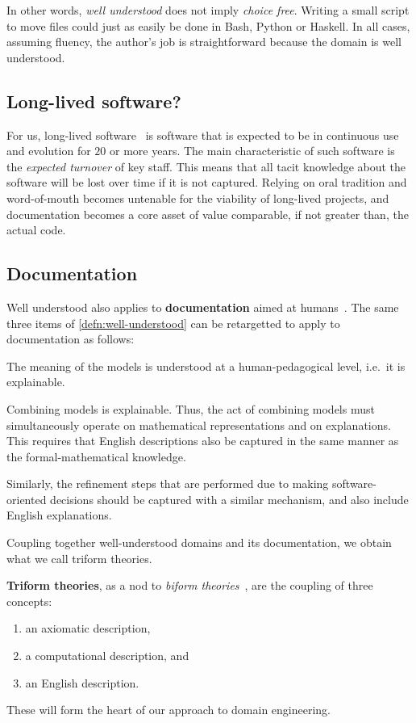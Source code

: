 \documentclass[a4paper,UKenglish,cleveref,autoref,thm-restate]{oasics-v2021}
\begin{document}
In other words, \emph{well understood} does not imply \emph{choice free}.
Writing a small script to move files could just as easily be done in Bash,
Python or Haskell. In all cases, assuming fluency, the author's job is
straightforward because the domain is well understood.

\subsection{Long-lived software?}
\label{subsec:long-lived-software}

For us, long-lived software~\cite{SPL-long-lived} is software that is expected
to be in continuous use and evolution for \(20\) or more years. The main
characteristic of such software is the \emph{expected turnover} of key staff.
This means that all tacit knowledge about the software will be lost over time if
it is not captured. Relying on oral tradition and word-of-mouth becomes untenable
for the viability of long-lived projects, and documentation becomes a core asset of
value comparable, if not greater than, the actual code.

\subsection{Documentation}
\label{subsec:documentation}

Well understood also applies to \textbf{documentation} aimed
at humans~\cite{parnas2011precise}. The same three items of
\ref{defn:well-understood} can be retargetted to apply to
documentation as follows:
\begin{enumerate*}
\item The meaning of the models is understood at a human-pedagogical level,
i.e.\ it is explainable.
\item Combining models is explainable. Thus, the act of combining models
must simultaneously
operate on mathematical representations and on explanations. This requires that
English descriptions also be captured in the same manner as the
formal-mathematical knowledge.
\item Similarly, the refinement steps that are performed due to making
software-oriented decisions should be captured with a similar mechanism, and
also include English explanations.
\end{enumerate*}

Coupling together well-understood domains and its documentation, we
obtain what we call triform theories.
\begin{definition}
\label{defn:triform-theories}
\textbf{Triform theories}, as a nod to \emph{biform
theories}~\cite{Farmer2007}, are the coupling of three concepts:
\begin{enumerate}
  \item an axiomatic description,
  \item a computational description, and
  \item an English description.
\end{enumerate}
\end{definition}
\noindent These will form the heart of our approach to domain engineering.
\end{document}
